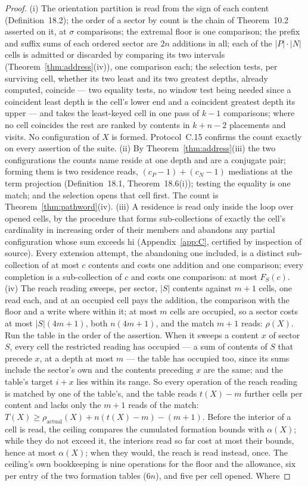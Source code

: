 \documentclass[pdflatex,sn-mathphys-num]{sn-jnl}
\theoremstyle{thmstyleone}%
\theoremstyle{thmstyletwo}%
\theoremstyle{thmstylethree}%
\begin{document}
\begin{proof}
(i) The orientation partition is read from the sign of each content (Definition~18.2); the order of a sector by count is the chain of Theorem~10.2 asserted on it, at $\sigma$ comparisons; the extremal floor is one comparison; the prefix and suffix sums of each ordered sector are $2n$ additions in all; each of the $|P|\cdot|N|$ cells is admitted or discarded by comparing its two intervals (Theorem~\ref{thm:address}(iv)), one comparison each; the selection tests, per surviving cell, whether its two least and its two greatest depths, already computed, coincide --- two equality tests, no window test being needed since a coincident least depth is the cell's lower end and a coincident greatest depth its upper --- and takes the least-keyed cell in one pass of $k-1$ comparisons; where no cell coincides the rest are ranked by contents in $k+n-2$ placements and visits. No configuration of $X$ is formed. Protocol~C.15 confirms the count exactly on every assertion of the suite. (ii) By Theorem~\ref{thm:address}(iii) the two configurations the counts name reside at one depth and are a conjugate pair; forming them is two residence reads, $(c_P-1)+(c_N-1)$ mediations at the term projection (Definition~18.1, Theorem~18.6(i)); testing the equality is one match; and the selection opens that cell first. The count is Theorem~\ref{thm:pathword}(iv). (iii) A residence is read only inside the loop over opened cells, by the procedure that forms sub-collections of exactly the cell's cardinality in increasing order of their members and abandons any partial configuration whose sum exceeds $\mathrm{hi}$ (Appendix~\ref{app:C}, certified by inspection of source). Every extension attempt, the abandoning one included, is a distinct sub-collection of at most $c$ contents and costs one addition and one comparison; every completion is a sub-collection of $c$ and costs one comparison: at most $F_S(c)$. (iv) The reach reading sweeps, per sector, $|S|$ contents against $m+1$ cells, one read each, and at an occupied cell pays the addition, the comparison with the floor and a write where within it; at most $m$ cells are occupied, so a sector costs at most $|S|(4m+1)$, both $n(4m+1)$, and the match $m+1$ reads: $\rho(X)$. Run the table in the order of the assertion. When it sweeps a content $x$ of sector $S$, every cell the restricted reading has occupied --- a sum of contents of $S$ that precede $x$, at a depth at most $m$ --- the table has occupied too, since its sums include the sector's own and the contents preceding $x$ are the same; and the table's target $i+x$ lies within its range. So every operation of the reach reading is matched by one of the table's, and the table reads $t(X)-m$ further cells per content and lacks only the $m+1$ reads of the match: $T(X)\ge\rho_{\mathrm{actual}}(X)+n(t(X)-m)-(m+1)$. Before the interior of a cell is read, the ceiling compares the cumulated formation bounds with $\alpha(X)$; while they do not exceed it, the interiors read so far cost at most their bounds, hence at most $\alpha(X)$; when they would, the reach is read instead, once. The ceiling's own bookkeeping is nine operations for the floor and the allowance, six per entry of the two formation tables ($6n$), and five per cell opened. Where 
\end{proof}
\end{document}
